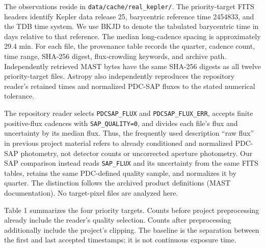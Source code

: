 \documentclass[
  english,
]{article}
\begin{document}
The observations reside in \texttt{data/cache/real\_kepler/}. The
priority-target FITS headers identify Kepler data release 25,
barycentric reference time 2454833, and the TDB time system. We use BKJD
to denote the tabulated barycentric time in days relative to that
reference. The median long-cadence spacing is approximately 29.4 min.
For each file, the provenance table records the quarter, cadence count,
time range, SHA-256 digest, flux-crowding keywords, and archive path.
Independently retrieved MAST bytes have the same SHA-256 digests as all
twelve priority-target files. Astropy also independently reproduces the
repository reader's retained times and normalized PDC-SAP fluxes to the
stated numerical tolerance.

The repository reader selects \texttt{PDCSAP\_FLUX} and
\texttt{PDCSAP\_FLUX\_ERR}, accepts finite positive-flux cadences with
\texttt{SAP\_QUALITY=0}, and divides each file's flux and uncertainty by
its median flux. Thus, the frequently used description ``raw flux'' in
previous project material refers to already conditioned and normalized
PDC-SAP photometry, not detector counts or uncorrected aperture
photometry. Our SAP comparison instead reads \texttt{SAP\_FLUX} and its
uncertainty from the same FITS tables, retains the same PDC-defined
quality sample, and normalizes it by quarter. The distinction follows
the archived product definitions (MAST documentation). No target-pixel
files are analyzed here.

Table 1 summarizes the four priority targets. Counts before project
preprocessing already include the reader's quality selection. Counts
after preprocessing additionally include the project's clipping. The
baseline is the separation between the first and last accepted
timestamps; it is not continuous exposure time.
\end{document}
